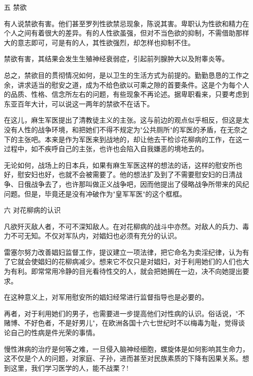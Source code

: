 \documentclass[12pt,UTF8]{ctexbook}
\begin{document}
五 禁欲



有人说禁欲有害。他们甚至罗列性欲禁忌现象，陈说其害。卑职认为性欲和精力在个人之间有着很大的差异。有的人性欲虽强，但对不当色欲的抑制，不需借助那样大的意志即可，可是有的人，其性欲强烈，却怎样也抑制不住。



禁欲有害，其结果会发生生殖神经衰弱症，引起前列腺肿大以及附睾炎等。



总之，禁欲目的贯彻情况如何，是以卫生的生活方式为前提的。勤勤恳恳的工作之余，讲求适当的慰安之道，成为不给色欲以可乘之隙的首要条件。这是个为每个人的品质、性格、信念所左右的问题，有些现象不再论述。据卑职看来，只要考虑到东亚百年大计，可以说这一两年的禁欲不在话下。



在这儿，麻生军医提出了清教徒主义的主张。这与前边的观点似乎相反，但这是太没有人性的战争环境，和把她们不得不规定为"公共厕所"的军医的矛盾，在无奈之下的主张吧。本来是作为军医来到战地的，却让他去干检诊花柳病的工作，在这一过程中，如不疾呼自己的主张，也许也会陷入自我嫌恶的境地去的。



无论如何，战场上的日本兵，如果有麻生军医这样的想法的话，这样的慰安所也好，慰安妇也好，也就不会被需要了。他的想法扩及到了不需要慰安妇的日清战争、日俄战争去了，也许那叫做正义战争吧，因而他提出了侵略战争所带来的风纪问题。但是，毕竟还是没有冲破作为"皇军军医"的这个框框。



六 对花柳病的认识



凡欲歼灭敌人者，不可不深知敌人。在对花柳病的战斗中亦然。对敌人的兵力、毒力不可无知。不仅对军队内，对娼妇也必须有充分的认识。



雷塞尔努力改善娼妇监督工作，提议建立一项法律，把它命名为卖淫纪律，认为有了它就会使娼妇的花柳病减少。想来它不仅只是对娼妇，对于利用她们的人们也大为有利。即常常用冷静的目光看待性交的人，就会把她搁在一边，决不向她提出要求。



在这种意义上，对军用慰安所的娼妇经常进行监督指导也是必要的。



再者，对于利用她们的男子，也需要进一步提高他们对性病的认识。俗话说，"不赌博、不好色者，不是好男儿"，在欧洲各国十六七世纪时不以梅毒为耻，觉得谈论自己的性病是件光荣的事情。



慢性淋病的治疗是何等之难，一旦侵入脑神经细胞，螺旋体是如何影响其生命力，这不仅是个人的问题，对家庭、子孙，进而甚至对民族素质的下降有因果关系。想到这里，我们学习医学的人，能不战栗？!
\end{document}
